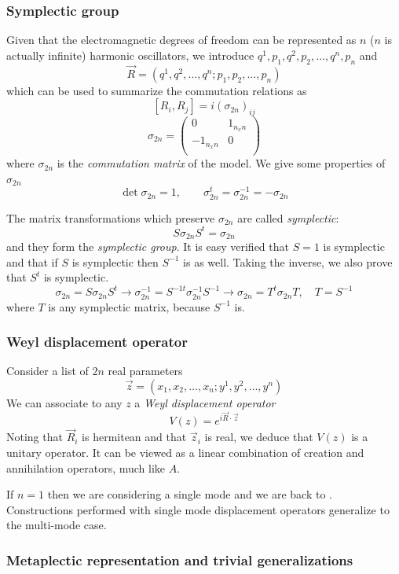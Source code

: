 \documentclass[a4paper, 11pt]{article}
\begin{document}
	\subsubsection{Symplectic group}
	Given that the electromagnetic degrees of freedom can be represented as $n$ ($n$ is actually infinite) harmonic oscillators, we introduce
	$q^1,p_1,q^2,p_2,\dots,q^n,p_n$ and
	\[ \vec{R} = (q^1,q^2,\dots,q^n;p_1,p_2,\dots,p_n) \]
	which can be used to summarize the commutation relations as
	\[ [R_i, R_j] = i (\sigma_{2n})_{ij} \]
	\[ \sigma_{2n} = \begin{pmatrix}
	0 & 1_{n _xn} \\
	-1_{n _xn} & 0 \\
	\end{pmatrix} \]
	where $\sigma_{2n}$ is the \emph{commutation matrix} of the model. We give some properties of $\sigma_{2n}$
	\[ \det \sigma_{2n} = 1,\qquad \sigma_{2n}^t = \sigma_{2n}^{-1} = -\sigma_{2n} \]
	\vspace{2mm}
	
	\noindent The matrix transformations which preserve $\sigma_{2n}$ are called \emph{symplectic}:
	\[ S\sigma_{2n} S^t = \sigma_{2n} \]
	and they form the \emph{symplectic group}. It is easy verified that $S=1$ is symplectic and that if $S$ is symplectic then $S^{-1}$ is as well. Taking the inverse, we also prove that $S^t$ is symplectic.
	\[ \sigma_{2n} = S\sigma_{2n}S^t \rightarrow \sigma_{2n}^{-1} = S^{-1t}\sigma_{2n}^{-1} S^{-1} \rightarrow \sigma_{2n} = T^t \sigma_{2n} T,\quad T = S^{-1} \]
	where $T$ is any symplectic matrix, because $S^{-1}$ is.
	
	\subsubsection{Weyl displacement operator}
	Consider a list of $2n$ real parameters
	\[ \vec{z} = (x_1,x_2,\dots,x_n;y^1,y^2,\dots,y^n) \]
	We can associate to any $z$ a \emph{Weyl displacement operator}
	\[ V(z) = e^{i\vec{R}\cdot \vec{z}} \]
	Noting that $\vec{R}_i$ is hermitean and that $\vec{z}_i$ is real, we deduce that $V(z)$ is a unitary operator. It can be viewed as a linear combination of creation and annihilation operators, much like $A$.
	
	\noindent If $n=1$ then we are considering a single mode and we are back to . Constructions performed with single mode displacement operators generalize to the multi-mode case.
	
	\subsubsection{Metaplectic representation and trivial generalizations}
	
\end{document}
